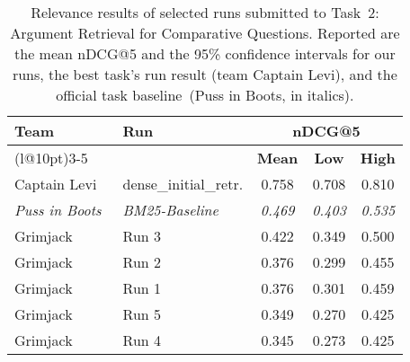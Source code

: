 \begin{table}[t]
\centering
\small
\renewcommand{\tabcolsep}{10pt}
\caption{Relevance results of selected runs submitted to Task~2: Argument Retrieval for Comparative Questions. Reported are the mean nDCG@5 and the 95\% confidence intervals for our runs, the best task's run result (team Captain Levi), and the official task baseline~(Puss in Boots, in italics).}
\label{table-results-relevance}
\begin{tabular}{@{}llccc@{}}
\toprule
\textbf{Team} & \textbf{Run} & \multicolumn{3}{c}{\textbf{nDCG@5}} \\
\cmidrule(l@{\tabcolsep}){3-5}
& & \textbf{Mean} & \textbf{Low} & \textbf{High} \\
\midrule
Captain Levi~\cite{RanaGJCEHP2022} & dense\_initial\_retr. & 0.758 & 0.708 & 0.810 \\
\textit{Puss in Boots}~\cite{BondarenkoFKSGBPBSWPH2022} & \textit{BM25-Baseline} & \textit{0.469} & \textit{0.403} & \textit{0.535} \\
Grimjack & Run 3 & 0.422 & 0.349 & 0.500 \\
Grimjack & Run 2 & 0.376 & 0.299 & 0.455 \\
Grimjack & Run 1 & 0.376 & 0.301 & 0.459 \\
Grimjack & Run 5 & 0.349 & 0.270 & 0.425 \\
Grimjack & Run 4 & 0.345 & 0.273 & 0.425 \\
\bottomrule
\end{tabular}
\end{table}
